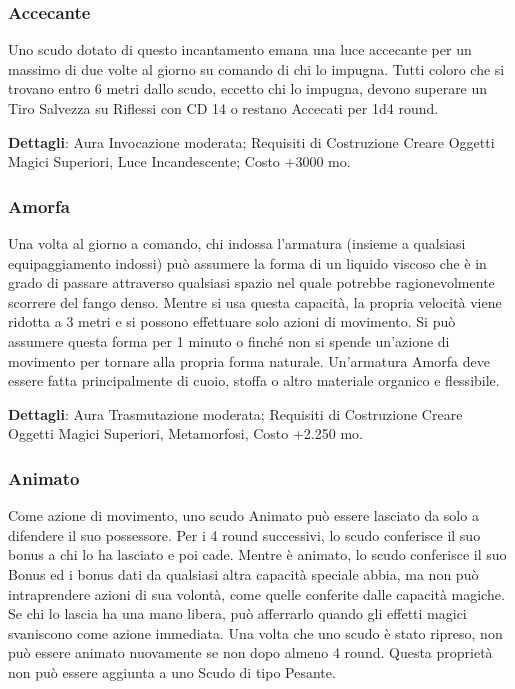 \begin{multicols}{2}
\subsubsection{Accecante}

Uno scudo dotato di questo incantamento emana una luce accecante per un massimo di due volte al giorno su comando di chi lo impugna. Tutti coloro che si trovano entro 6 metri dallo scudo, eccetto chi lo impugna, devono superare un Tiro Salvezza su Riflessi con CD 14 o restano Accecati per 1d4 round.

\textbf{Dettagli}: Aura Invocazione moderata; Requisiti di Costruzione Creare Oggetti Magici Superiori, Luce Incandescente; Costo +3000 mo.

\subsubsection{Amorfa}

Una volta al giorno a comando, chi indossa l'armatura (insieme a qualsiasi equipaggiamento indossi) può assumere la forma di un liquido viscoso che è in grado di passare attraverso qualsiasi spazio nel quale potrebbe ragionevolmente scorrere del fango denso. Mentre si usa questa capacità, la propria velocità viene ridotta a 3 metri e si possono effettuare solo azioni di movimento. Si può assumere questa forma per 1 minuto o finché non si spende un'azione di movimento per tornare alla propria forma naturale. Un'armatura Amorfa deve essere fatta principalmente di cuoio, stoffa o altro materiale organico e flessibile.

\textbf{Dettagli}: Aura Trasmutazione moderata; Requisiti di Costruzione Creare Oggetti Magici Superiori, Metamorfosi, Costo +2.250 mo.

\subsubsection{Animato}

Come azione di movimento, uno scudo Animato può essere lasciato da solo a difendere il suo possessore. Per i 4 round successivi, lo scudo conferisce il suo bonus a chi lo ha lasciato e poi cade. Mentre è animato, lo scudo conferisce il suo Bonus ed i bonus dati da qualsiasi altra capacità speciale abbia, ma non può intraprendere azioni di sua volontà, come quelle conferite dalle capacità magiche.
Se chi lo lascia ha una mano libera, può afferrarlo quando gli effetti magici svaniscono come azione immediata. Una volta che uno scudo è stato ripreso, non può essere animato nuovamente se non dopo almeno 4 round. Questa proprietà non può essere aggiunta a uno Scudo di tipo Pesante.


\end{multicols}
